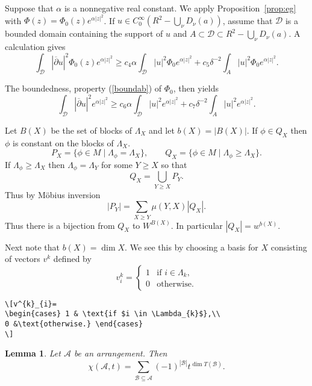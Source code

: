 \documentclass{article}
\newtheorem{lem}[thm]{Lemma}
\theoremstyle{definition}
\theoremstyle{remark}
\newcommand{\A}{\mathcal{A}}
\newcommand{\cB}{\mathcal{B}}
\newcommand{\envert}[1]{\left\lvert#1\right\rvert}
\let\abs=\envert
\begin{document}
Suppose that $\alpha$ is a nonnegative real constant. We apply
Proposition~\ref{prop:eg} with $\Phi(z)=\Phi_ 0(z) e^{\alpha\abs{z}^2}$. If
$u\in C^\infty_0(R^2-\bigcup_\nu D_\nu(a))$, assume that $\mathcal{D}$
is a bounded domain containing the support of $u$ and $A\subset
\mathcal{D}\subset R^2-\bigcup_\nu D_\nu(a)$. A calculation gives
\[\int_{\mathcal{D}}\abs{\overline\partial u}^2\Phi_ 0(z) e^{\alpha\abs{z}^2}
\geq c_4\alpha\int_{\mathcal{D}}\abs{u}^2\Phi_ 0e^{\alpha\abs{z}^2}
+c_5\delta^{-2}\int_ A\abs{u}^2\Phi_ 0e^{\alpha\abs{z}^2}.\]

The boundedness, property (\ref{boundab}) of $\Phi_ 0$, then yields
\[\int_{\mathcal{D}}\abs{\overline\partial u}^2e^{\alpha\abs{z}^2}\geq c_6\alpha
\int_{\mathcal{D}}\abs{u}^2e^{\alpha\abs{z}^2}
+c_7\delta^{-2}\int_ A\abs{u}^2e^{\alpha\abs{z}^2}.\]

Let $B(X)$ be the set of blocks of $\Lambda_{X}$
and let $b(X) = \abs{B(X)}$. If $\phi \in Q_{X}$ then
$\phi$ is constant on the blocks of $\Lambda_{X}$.
\begin{equation}\label{far-d}
 P_{X} = \{ \phi \in M \mid \Lambda_{\phi} = \Lambda_{X} \},
\qquad
Q_{X} = \{\phi \in M \mid \Lambda_{\phi} \geq \Lambda_{X} \}.
\end{equation}
If $\Lambda_{\phi} \geq \Lambda_{X}$ then
$\Lambda_{\phi} = \Lambda_{Y}$ for some $Y \geq X$ so that
\[ Q_{X} = \bigcup_{Y \geq X} P_{Y}. \]
Thus by M\"obius inversion
\[ \abs{P_{Y}}= \sum_{X\geq Y} \mu (Y,X)\abs{Q_{X}}.\]
Thus there is a bijection from $Q_{X}$ to $W^{B(X)}$.
In particular $\abs{Q_{X}} = w^{b(X)}$.

Next note that $b(X)=\dim X$. We see this by choosing a
basis for $X$ consisting of vectors $v^{k}$ defined by
\[v^{k}_{i}=
\begin{cases} 1 & \text{if $i \in \Lambda_{k}$},\\
0 &\text{otherwise.} \end{cases}
\]
\begin{verbatim}
\[v^{k}_{i}=
\begin{cases} 1 & \text{if $i \in \Lambda_{k}$},\\
0 &\text{otherwise.} \end{cases}
\]
\end{verbatim}

\begin{lem}\label{p0201}
Let $\A$ be an arrangement. Then
\[ \chi (\A,t) = \sum_{\cB \subseteq \A}
(-1)^{\abs{\cB}} t^{\dim T(\cB)}. \]
\end{lem}
\end{document}
